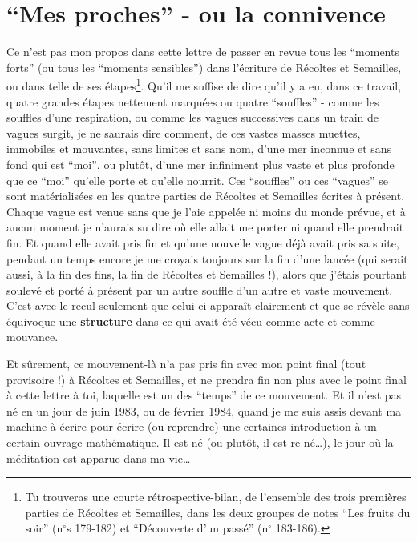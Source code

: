 \section{``Mes proches'' - ou la connivence}

Ce n'est pas mon propos dans cette lettre de passer en revue tous les ``moments forts'' (ou tous les ``moments sensibles'') dans l'écriture de Récoltes et Semailles, ou dans telle de ses étapes\footnote{Tu trouveras une courte rétrospective-bilan, de l'ensemble des trois premières parties de Récoltes et Semailles, dans les deux groupes de notes ``Les fruits du soir'' (n$^{\circ}$s 179-182) et ``Découverte d'un passé'' (n$^{\circ}$ 183-186).}. Qu'il me suffise de dire qu'il y a eu, dans ce travail, quatre grandes étapes nettement marquées ou quatre ``souffles'' - comme les souffles d'une respiration, ou comme les vagues successives dans un train de vagues surgit, je ne saurais dire comment, de ces vastes masses muettes, immobiles et mouvantes, sans limites et sans nom, d'une mer inconnue et sans fond qui est ``moi'', ou plutôt, d'une mer infiniment plus vaste et plus profonde que ce ``moi'' qu'elle porte et qu'elle nourrit. Ces ``souffles'' ou ces ``vagues'' se sont matérialisées en les quatre parties de Récoltes et Semailles écrites à présent. Chaque vague est venue sans que je l'aie appelée ni moins du monde prévue, et à aucun moment je n'aurais su dire où elle allait me porter ni quand elle prendrait fin. Et quand elle avait pris fin et qu'une nouvelle vague déjà avait pris sa suite, pendant un temps encore je me croyais toujours sur la fin d'une lancée (qui serait aussi, à la fin des fins, la fin de Récoltes et Semailles !), alors que j'étais pourtant soulevé et porté à présent par un autre souffle d'un autre et vaste mouvement. C'est avec le recul seulement que celui-ci apparaît clairement et que se révèle sans équivoque une \textbf{structure} dans ce qui avait été vécu comme acte et comme mouvance.

Et sûrement, ce mouvement-là n'a pas pris fin avec mon point final (tout provisoire !) à Récoltes et Semailles, et ne prendra fin non plus avec le point final à cette lettre à toi, laquelle est un des ``temps'' de ce mouvement. Et il n'est pas né en un jour de juin 1983, ou de février 1984, quand je me suis assis devant ma machine à écrire pour écrire (ou reprendre) une certaines introduction à un certain ouvrage mathématique. Il est né (ou plutôt, il est re-né\ldots), le jour où la méditation est apparue dans ma vie\ldots

